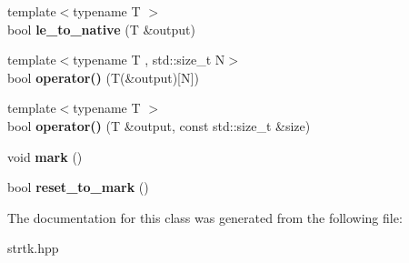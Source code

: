 \begin{DoxyCompactItemize}
\item 
\hypertarget{classstrtk_1_1binary_1_1reader_ae48dbc44422b1da0b25b7c3ff464cacd}{{\footnotesize template$<$typename T $>$ }\\bool {\bfseries le\-\_\-to\-\_\-native} (T \&output)}\label{classstrtk_1_1binary_1_1reader_ae48dbc44422b1da0b25b7c3ff464cacd}

\item 
\hypertarget{classstrtk_1_1binary_1_1reader_a36b4317b42c9889b6066ed7728f0c1cf}{{\footnotesize template$<$typename T , std\-::size\-\_\-t N$>$ }\\bool {\bfseries operator()} (T(\&output)\mbox{[}N\mbox{]})}\label{classstrtk_1_1binary_1_1reader_a36b4317b42c9889b6066ed7728f0c1cf}

\item 
\hypertarget{classstrtk_1_1binary_1_1reader_a4944efd16c67e6f2bdc35ee2f97b9ab4}{{\footnotesize template$<$typename T $>$ }\\bool {\bfseries operator()} (T \&output, const std\-::size\-\_\-t \&size)}\label{classstrtk_1_1binary_1_1reader_a4944efd16c67e6f2bdc35ee2f97b9ab4}

\item 
\hypertarget{classstrtk_1_1binary_1_1reader_aebd3667fe3e2e376be127795b71c21e8}{void {\bfseries mark} ()}\label{classstrtk_1_1binary_1_1reader_aebd3667fe3e2e376be127795b71c21e8}

\item 
\hypertarget{classstrtk_1_1binary_1_1reader_a3ef883aae38e2f3e8d1ecc4b61ee3363}{bool {\bfseries reset\-\_\-to\-\_\-mark} ()}\label{classstrtk_1_1binary_1_1reader_a3ef883aae38e2f3e8d1ecc4b61ee3363}

\end{DoxyCompactItemize}


The documentation for this class was generated from the following file\-:\begin{DoxyCompactItemize}
\item 
strtk.\-hpp\end{DoxyCompactItemize}

